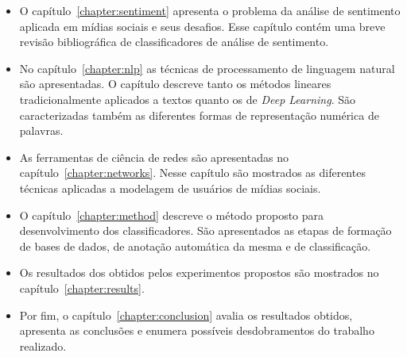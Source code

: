 \begin{itemize}
    \item O capítulo~\ref{chapter:sentiment} apresenta o problema da análise
        de sentimento aplicada em mídias sociais e seus desafios.
        Esse capítulo contém uma breve revisão bibliográfica de classificadores
        de análise de sentimento.
    \item No capítulo~\ref{chapter:nlp} as técnicas de processamento de
        linguagem natural são apresentadas.
        O capítulo descreve tanto os métodos lineares tradicionalmente
        aplicados a textos quanto os de \textit{Deep Learning}.
        São caracterizadas também as diferentes formas de representação numérica
        de palavras.
    \item As ferramentas de ciência de redes são apresentadas no
        capítulo~\ref{chapter:networks}.
        Nesse capítulo são mostrados as diferentes técnicas aplicadas a
        modelagem de usuários de mídias sociais.
    \item O capítulo~\ref{chapter:method} descreve o método proposto para
        desenvolvimento dos classificadores.
        São apresentados as etapas de formação de bases de dados, de anotação
        automática da mesma e de classificação.
    \item Os resultados dos obtidos pelos experimentos propostos são mostrados
        no capítulo~\ref{chapter:results}.
    \item Por fim, o capítulo~\ref{chapter:conclusion} avalia os resultados
        obtidos, apresenta as conclusões e enumera possíveis desdobramentos do
        trabalho realizado.
\end{itemize}

